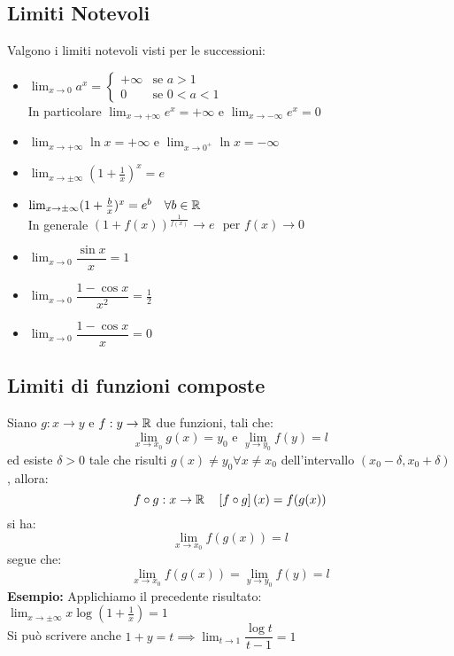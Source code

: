 \documentclass[../../main.tex]{subfiles}
\begin{document}
\subsection{Limiti Notevoli}
Valgono i limiti notevoli visti per le successioni:
\begin{itemize}
    \item $\lim_{x\to 0} a^x = \begin{cases}
                  +\infty & \text{se } a > 1     \\
                  0       & \text{se } 0 < a < 1
              \end{cases}$\\In particolare $\lim_{x\to+\infty} e^x = +\infty$ e $\lim_{x\to-\infty} e^x = 0$
    \item $\lim_{x\to +\infty} \ln x = +\infty$ e $\lim_{x\to 0^+} \ln x = -\infty$
    \item $\lim_{x\to\pm\infty} (1+\frac{1}{x})^x = e$
    \item $\lim_{x\to\pm\infty} (1+\frac{b}{x})^x = e^b \ \ \ \forall b\in\mathbb{R}$\\ In generale $(1+f(x))^{\frac{1}{f(x)}} \to e \ \ \ \text{per } f(x)\to 0$
    \item $\lim_{x\to0} \dfrac{\sin x}{x} = 1$
    \item $\lim_{x\to0} \dfrac{1-\cos x}{x^2} = \frac{1}{2}$
    \item $\lim_{x\to0} \dfrac{1-\cos x}{x} = 0$
\end{itemize}

\subsection{Limiti di funzioni composte}
Siano $g: x \to y$ e $f: y \to \mathbb{R}$ due funzioni, tali che:
\[
    \lim_{x\to x_0} g(x) = y_0 \text{ e } \lim_{y\to y_0} f(y) = l
\]
ed esiste $\delta > 0$ tale che risulti $g(x) \neq y_0 \forall x\neq x_0$
dell'intervallo $(x_0 - \delta, x_0 + \delta)$, allora:
\[
    f \circ g: x \to \mathbb{R} \ \ \ \left[ f \circ g \right] (x) = f(g(x))
\]
si ha:
\[
    \lim_{x\to x_0} f(g(x)) = l
\]
segue che:
\[
    \lim_{x\to x_0} f(g(x)) = \lim_{y\to y_0} f(y) = l
\]
\textbf{Esempio:} Applichiamo il precedente risultato:\\
$\lim_{x\to\pm\infty} x\log(1+\frac{1}{x}) = 1$\\
Si può scrivere anche $1+y = t \implies \lim_{t\to 1} \dfrac{\log t}{t-1} = 1$\\
\end{document}
